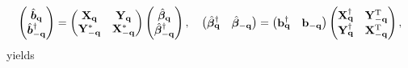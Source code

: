\begin{equation}
        \begin{pmatrix}
        \hat{\bm{b}}_{\mathbf q}\\
        \hat{\bm{b}}_{-\mathbf q}^{\dagger}
    \end{pmatrix} = \begin{pmatrix}
        \mathbf X_{\mathbf q} & \mathbf Y_{\mathbf q}\\
        \mathbf Y_{-\mathbf q}^{*} & \mathbf X_{-\mathbf q}^{*}
    \end{pmatrix}
    \begin{pmatrix}
        \hat{\bm{\beta}}_{\mathbf q}\\
        \hat{\bm{\beta}}_{-\mathbf q}^{\dagger}
    \end{pmatrix}, \quad \begin{pmatrix} \hat{\bm{\beta}}_{\mathbf q}^{\dagger} & \hat{\bm{\beta}}_{-\mathbf q} \end{pmatrix} = \begin{pmatrix}
        \mathbf b_{\mathbf q}^{\dagger} & \mathbf b_{-\mathbf q}
    \end{pmatrix}
    \begin{pmatrix}
        \mathbf X_{\mathbf q}^{\dagger} & \mathbf Y_{-\mathbf q}^{\rm T}\\
        \mathbf Y_{\mathbf q}^{\dagger} & \mathbf X_{-\mathbf q}^{\rm T}
    \end{pmatrix},
\end{equation}
yields
